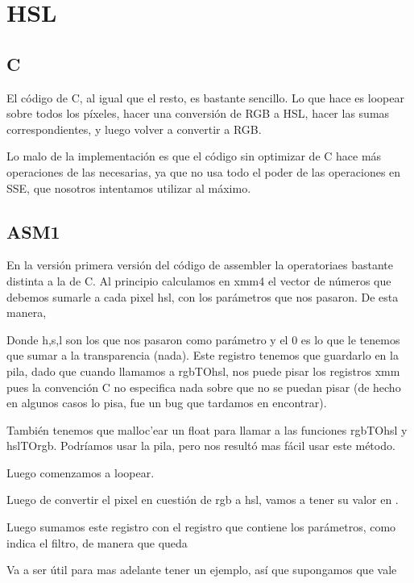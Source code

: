 \section{HSL}

\subsection{C}
El código de C, al igual que el resto, es bastante sencillo. Lo que hace es loopear sobre todos los píxeles, hacer una conversión de RGB a HSL, hacer las sumas correspondientes, y luego volver a convertir a RGB.

Lo malo de la implementación es que el código sin optimizar de C hace más operaciones de las necesarias, ya que no usa todo el poder de las operaciones en SSE, que nosotros intentamos utilizar al máximo.

\subsection{ASM1}

En la versión primera versión del código de assembler la operatoriaes bastante distinta a la de C.
Al principio calculamos en xmm4 el vector de números que debemos sumarle a cada pixel hsl, con los parámetros que nos pasaron. De esta manera, 


Donde h,s,l son los que nos pasaron como parámetro y el 0 es lo que le tenemos que sumar a la transparencia (nada). Este registro tenemos que guardarlo en la pila, dado que cuando llamamos a rgbTOhsl, nos puede pisar los registros xmm pues la convención C no especifica nada sobre que no se puedan pisar (de hecho en algunos casos lo pisa, fue un bug que tardamos en encontrar).

También tenemos que malloc'ear un float para llamar a las funciones rgbTOhsl y hslTOrgb. Podríamos usar la pila, pero nos resultó mas fácil usar este método.

Luego comenzamos a loopear. 

Luego de convertir el pixel en cuestión de rgb a hsl, vamos a tener su valor en .


Luego sumamos este registro con el registro que contiene los parámetros, como indica el filtro, de manera que queda


Va a ser útil para mas adelante tener un ejemplo, así que supongamos que  vale

